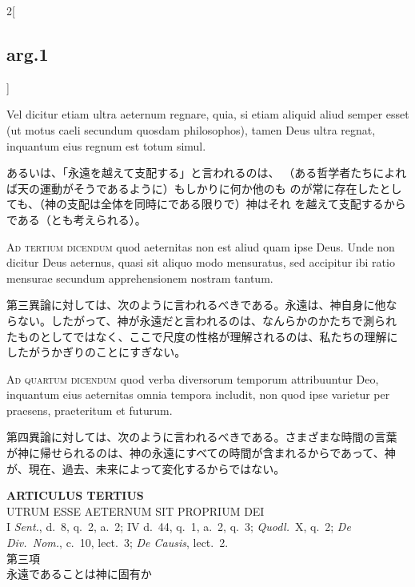 \documentclass[paper=a4paper,fontsize=10pt,jafontsize=9pt,titlepage]{jlreq}
\begin{document}
\begin{paracol}{2}[\subsection{arg.1}]
\switchcolumn*

Vel dicitur etiam ultra aeternum regnare,
quia, si etiam aliquid aliud semper esset (ut motus caeli secundum
quosdam philosophos), tamen Deus ultra regnat, inquantum eius regnum est
totum simul.

\switchcolumn

あるいは、「永遠を越えて支配する」と言われるのは、
（ある哲学者たちによれば天の運動がそうであるように）もしかりに何か他のも
のが常に存在したとしても、（神の支配は全体を同時にである限りで）神はそれ
を越えて支配するからである（とも考えられる）。

\switchcolumn*[\subsection{ad.3}]

{\scshape Ad tertium dicendum} quod aeternitas non est aliud quam ipse
Deus. Unde non dicitur Deus aeternus, quasi sit aliquo modo mensuratus,
sed accipitur ibi ratio mensurae secundum apprehensionem nostram tantum.

\switchcolumn

第三異論に対しては、次のように言われるべきである。永遠は、神自身に他な
らない。したがって、神が永遠だと言われるのは、なんらかのかたちで測られ
たものとしてではなく、ここで尺度の性格が理解されるのは、私たちの理解に
したがうかぎりのことにすぎない。

\switchcolumn*[\subsection{ad.4}]

{\scshape Ad quartum dicendum} quod verba diversorum temporum attribuuntur Deo,
inquantum eius aeternitas omnia tempora includit, non quod ipse varietur
per praesens, praeteritum et futurum.

\switchcolumn

第四異論に対しては、次のように言われるべきである。さまざまな時間の言葉
が神に帰せられるのは、神の永遠にすべての時間が含まれるからであって、神
が、現在、過去、未来によって変化するからではない。

\end{paracol}

\newpage
{}


\begin{center}
 {\Large {\bfseries ARTICULUS TERTIUS}}\\
 {\large UTRUM ESSE AETERNUM SIT PROPRIUM DEI}\\
 {\footnotesize I {\itshape Sent.}, d.~8, q.~2, a.~2; IV d.~44, q.~1,
 a.~2, q.~3; {\itshape Quodl.}~X, q.~2; {\itshape De Div.~Nom.}, c.~10,
 lect.~3; {\itshape De Causis}, lect.~2.}\\
 {\Large 第三項\\永遠であることは神に固有か}
\end{center}
\end{document}
